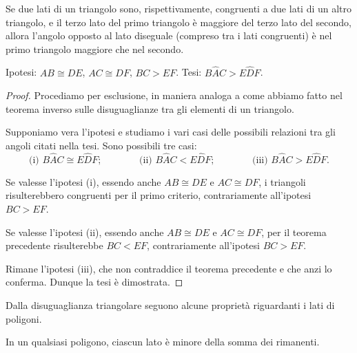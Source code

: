 \begin{teorema}
Se due lati di un triangolo sono, rispettivamente, congruenti a due 
lati di un altro triangolo, e il terzo lato del primo triangolo è 
maggiore del terzo lato del secondo, allora l'angolo opposto al lato 
diseguale (compreso tra i lati congruenti) è nel primo triangolo 
maggiore che nel secondo.
\end{teorema}

\noindent Ipotesi: $AB\cong DE$, $AC\cong DF$, $BC>EF$. Tesi: 
$B\widehat{A}C>E\widehat{D}F$.


\begin{inaccessibleblock}
 \begin{figure}[htb]
\centering
\end{figure}
\end{inaccessibleblock}

\begin{proof}
Procediamo per esclusione, in maniera analoga a come abbiamo fatto 
nel teorema inverso sulle disuguaglianze tra gli elementi di un 
triangolo.

Supponiamo vera l'ipotesi e studiamo i vari casi delle possibili 
relazioni tra gli angoli citati nella tesi. Sono possibili tre casi:
\[\text{(i) }B\widehat{A}C\cong E\widehat{D}F\text{;}\qquad\qquad 
\text{(ii) }B\widehat{A}C<E\widehat{D}F\text{;}\qquad\qquad 
\text{(iii) }B\widehat{A}C>E\widehat{D}F\text{.}\]

Se valesse l'ipotesi (i), essendo anche $AB\cong DE$ e $AC\cong DF$, 
i triangoli risulterebbero congruenti per il primo criterio, 
contrariamente all'ipotesi $BC>EF$.

Se valesse l'ipotesi (ii), essendo anche $AB\cong DE$ e $AC\cong DF$, 
per il teorema precedente risulterebbe $BC<EF$, contrariamente 
all'ipotesi $BC>EF$.

Rimane l'ipotesi (iii), che non contraddice il teorema precedente e 
che anzi lo conferma. Dunque la tesi è dimostrata.
\end{proof}

Dalla disuguaglianza triangolare seguono alcune proprietà riguardanti 
i lati di poligoni.

\begin{teorema}
In un qualsiasi poligono, ciascun lato è minore della somma dei 
rimanenti.
\end{teorema}

